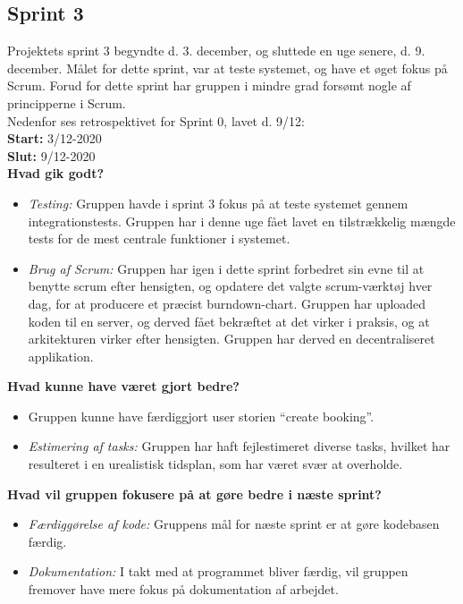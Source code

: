\subsection{Sprint 3}
Projektets sprint 3 begyndte d. 3. december, og sluttede en uge senere, d. 9. december.
Målet for dette sprint, var at teste systemet, og have et øget fokus på Scrum. Forud for dette sprint
har gruppen i mindre grad forsømt nogle af principperne i Scrum. \\
Nedenfor ses retrospektivet for Sprint 0, lavet d. 9/12: \\

\textbf{Start:} 3/12-2020 \\
\textbf{Slut:} 9/12-2020 \\

\textbf{Hvad gik godt?}
\begin{itemize}
    \item \textit{Testing:} Gruppen havde i sprint 3 fokus på at teste systemet gennem integrationstests. Gruppen har i denne uge fået 
    lavet en tilstrækkelig mængde tests for de mest centrale funktioner i systemet.
    \item \textit{Brug af Scrum:} Gruppen har igen i dette sprint forbedret sin evne til at benytte scrum efter hensigten, og opdatere 
    det valgte scrum-værktøj hver dag, for at producere et præcist burndown-chart.
    Gruppen har uploaded koden til en server, og derved fået bekræftet at det virker i praksis, og at arkitekturen virker efter hensigten. 
    Gruppen har derved en decentraliseret applikation.
\end{itemize}

\textbf{Hvad kunne have været gjort bedre?}
\begin{itemize}
    \item Gruppen kunne have færdiggjort user storien “create booking”.
    \item \textit{Estimering af tasks:} Gruppen har haft fejlestimeret diverse tasks, hvilket har resulteret i en urealistisk tidsplan, som har været
    svær at overholde.
\end{itemize}

\textbf{Hvad vil gruppen fokusere på at gøre bedre i næste sprint?}
\begin{itemize}
    \item \textit{Færdiggørelse af kode:} Gruppens mål for næste sprint er at gøre kodebasen færdig.
    \item \textit{Dokumentation:} I takt med at programmet bliver færdig, vil gruppen fremover have mere fokus på dokumentation af arbejdet.
\end{itemize}